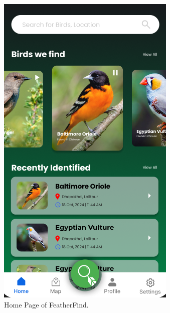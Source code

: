 \begin{figure}[h!]
    \centering
    \includegraphics[scale=0.5]{images/homepage.png}
    \caption{Home Page of FeatherFind.}
\end{figure}

